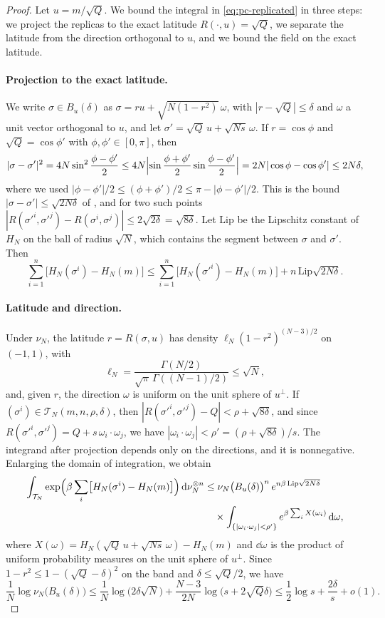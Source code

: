 \begin{proof}
Let $u=m/\sqrt Q$. We bound the integral in \eqref{eq:pc-replicated} in three steps: we project the replicas to the exact latitude $R(\cdot,u)=\sqrt Q$, we separate the latitude from the direction orthogonal to $u$, and we bound the field on the exact latitude.

\paragraph{Projection to the exact latitude.}
We write $\sigma\in B_u(\delta)$ as $\sigma=r u+\sqrt{N(1-r^2)}\,\omega$, with $|r-\sqrt Q|\le\delta$ and $\omega$ a unit vector orthogonal to $u$, and let $\sigma'=\sqrt Q\,u+\sqrt{Ns}\,\omega$. If $r=\cos\phi$ and $\sqrt Q=\cos\phi'$ with $\phi,\phi'\in[0,\pi]$, then
\[
|\sigma-\sigma'|^2=4N\sin^2\frac{\phi-\phi'}2\le4N\Bigl|\sin\frac{\phi+\phi'}2\sin\frac{\phi-\phi'}2\Bigr|=2N|\cos\phi-\cos\phi'|\le2N\delta,
\]
where we used $|\phi-\phi'|/2\le(\phi+\phi')/2\le\pi-|\phi-\phi'|/2$. This is the bound $|\sigma-\sigma'|\le\sqrt{2N\delta}$ of \cite[Lemma~18]{Subag2024}, and for two such points $|R(\sigma'^i,\sigma'^j)-R(\sigma^i,\sigma^j)|\le2\sqrt{2\delta}=\sqrt{8\delta}$. Let $\mathrm{Lip}$ be the Lipschitz constant of $H_N$ on the ball of radius $\sqrt N$, which contains the segment between $\sigma$ and $\sigma'$. Then
\[
\sum_{i=1}^n\bigl[H_N(\sigma^i)-H_N(m)\bigr]\le\sum_{i=1}^n\bigl[H_N(\sigma'^i)-H_N(m)\bigr]+n\,\mathrm{Lip}\sqrt{2N\delta}.
\]

\paragraph{Latitude and direction.}
Under $\nu_N$, the latitude $r=R(\sigma,u)$ has density $\ell_N(1-r^2)^{(N-3)/2}$ on $(-1,1)$, with
\begin{equation}\label{eq:pc-latitude}
\ell_N=\frac{\Gamma(N/2)}{\sqrt\pi\,\Gamma((N-1)/2)}\le\sqrt N,
\end{equation}
and, given $r$, the direction $\omega$ is uniform on the unit sphere of $u^\perp$. If $(\sigma^i)\in\mathcal T_N(m,n,\rho,\delta)$, then $|R(\sigma'^i,\sigma'^j)-Q|<\rho+\sqrt{8\delta}$, and since $R(\sigma'^i,\sigma'^j)=Q+s\,\omega_i\cdot\omega_j$, we have $|\omega_i\cdot\omega_j|<\rho'=(\rho+\sqrt{8\delta})/s$. The integrand after projection depends only on the directions, and it is nonnegative. Enlarging the domain of integration, we obtain
\[
\begin{split}
\int_{\mathcal T_N}\exp\Bigl(\beta\sum_i\bigl[H_N(\sigma^i)-H_N(m)\bigr]\Bigr)\,\mathrm d\nu_N^{\otimes n}&\le\nu_N\bigl(B_u(\delta)\bigr)^n\,e^{n\beta\,\mathrm{Lip}\sqrt{2N\delta}}\\
&\quad\times\int_{\{|\omega_i\cdot\omega_j|<\rho'\}}e^{\beta\sum_iX(\omega_i)}\,\mathrm d\omega,
\end{split}
\]
where $X(\omega)=H_N(\sqrt Q\,u+\sqrt{Ns}\,\omega)-H_N(m)$ and $\dd\omega$ is the product of uniform probability measures on the unit sphere of $u^\perp$. Since $1-r^2\le1-(\sqrt Q-\delta)^2$ on the band and $\delta\le\sqrt Q/2$, we have
\[
\frac1N\log\nu_N\bigl(B_u(\delta)\bigr)\le\frac1N\log\bigl(2\delta\sqrt N\bigr)+\frac{N-3}{2N}\log\bigl(s+2\sqrt Q\delta\bigr)\le\frac12\log s+\frac{2\delta}{s}+o(1).
\]


\end{proof}
